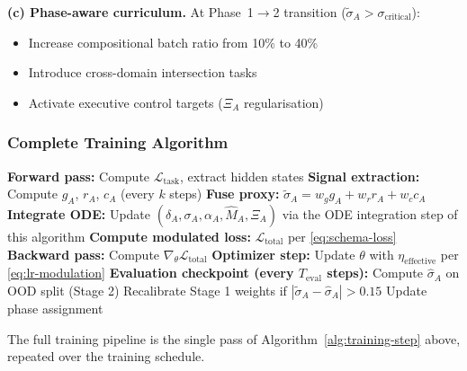 \documentclass[11pt]{article}
\theoremstyle{definition}
\theoremstyle{plain}
\begin{document}
\textbf{(c) Phase-aware curriculum.} At Phase~1$\to$2 transition
($\tilde{\sigma}_A > \sigma_{\text{critical}}$):
\begin{itemize}[nosep]
\item Increase compositional batch ratio from 10\% to 40\%
\item Introduce cross-domain intersection tasks
\item Activate executive control targets ($\Xi_A$ regularisation)
\end{itemize}

\subsubsection{Complete Training Algorithm}

\begin{algorithm}[H]
\caption{Σ-Model Training Step}\label{alg:training-step}
\begin{algorithmic}
\State \textbf{Forward pass:} Compute $\mathcal{L}_{\text{task}}$, extract hidden states
\State \textbf{Signal extraction:} Compute $g_A$, $r_A$, $c_A$ (every $k$ steps)
\State \textbf{Fuse proxy:} $\tilde{\sigma}_A = w_g g_A + w_r r_A + w_c c_A$
\State \textbf{Integrate ODE:} Update $(\delta_A, \sigma_A, \alpha_A, \hat{M}_A, \Xi_A)$ via the ODE integration step of this algorithm
\State \textbf{Compute modulated loss:} $\mathcal{L}_{\text{total}}$ per \eqref{eq:schema-loss}
\State \textbf{Backward pass:} Compute $\nabla_\theta \mathcal{L}_{\text{total}}$
\State \textbf{Optimizer step:} Update $\theta$ with $\eta_{\text{effective}}$ per \eqref{eq:lr-modulation}
\State \textbf{Evaluation checkpoint (every $T_{\text{eval}}$ steps):}
\State \hspace{\algorithmicindent} Compute $\hat{\sigma}_A$ on OOD split (Stage 2)
\State \hspace{\algorithmicindent} Recalibrate Stage 1 weights if $|\tilde{\sigma}_A - \hat{\sigma}_A| > 0.15$
\State \hspace{\algorithmicindent} Update phase assignment
\end{algorithmic}
\end{algorithm}



The full training pipeline is the single pass of Algorithm~\ref{alg:training-step}
above, repeated over the training schedule.
\end{document}
